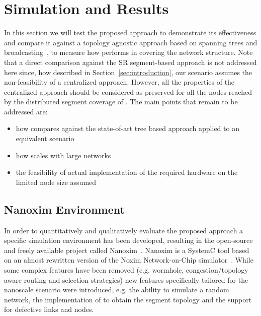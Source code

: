 
\section{Simulation and Results}
\label{sec:simulation}

In this section we will test the proposed \disr{} approach to
demonstrate its effectiveness and compare it against a topology
agnostic approach based on spanning trees and
broadcasting~\cite{Patwardhan05evaluatingthe}, to measure how \disr{}
performs in covering the network structure. Note that a direct
comparison against the SR segment-based approach is not addressed
here since, how described in Section~\ref{sec:introduction}, our
scenario assumes the non-feasibility of a centralized approach. 
However, all the properties of the centralized approach should be
considered as preserved for all the nodes reached by the distributed
segment coverage of \disr{}. 
The main points that remain to be addressed are:
\begin{itemize}
\item how \disr{} compares against the state-of-art tree based approach
applied to an equivalent scenario
\item how \disr{} scales with large networks
\item the feasibility of actual implementation of the required hardware on the limited
node size assumed
\end{itemize}


\subsection{Nanoxim Environment}

In order to quantitatively and qualitatively evaluate the proposed approach a
specific simulation environment has been developed, resulting in
the open-source and freely available project called
Nanoxim~\cite{nanoxim}.
Nanoxim is a SystemC tool based on an almost rewritten
version of the Noxim Network-on-Chip simulator~\cite{noxim}. While some
complex features have been removed (e.g. wormhole, congestion/topology
aware routing and selection strategies) new features specifically
tailored for the nanoscale scenario were introduced, e.g. the ability to simulate a random
network, the implementation of \disr{} to obtain the segment topology
and the support for defective links and nodes.

